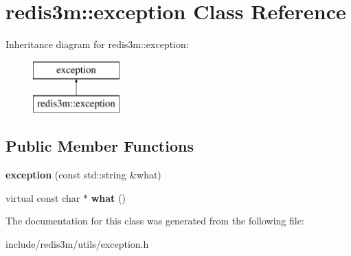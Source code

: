 \hypertarget{classredis3m_1_1exception}{\section{redis3m\-:\-:exception Class Reference}
\label{classredis3m_1_1exception}
}
Inheritance diagram for redis3m\-:\-:exception\-:\begin{figure}[H]
\begin{center}
\leavevmode
\includegraphics[height=2.000000cm]{classredis3m_1_1exception}
\end{center}
\end{figure}
\subsection*{Public Member Functions}
\begin{DoxyCompactItemize}
\item 
\hypertarget{classredis3m_1_1exception_a35b7fdb79d34ea259cf5a8473f20509c}{{\bfseries exception} (const std\-::string \&what)}\label{classredis3m_1_1exception_a35b7fdb79d34ea259cf5a8473f20509c}

\item 
\hypertarget{classredis3m_1_1exception_a08d93701a8d0d6900d2cae0304597f3c}{virtual const char $\ast$ {\bfseries what} ()}\label{classredis3m_1_1exception_a08d93701a8d0d6900d2cae0304597f3c}

\end{DoxyCompactItemize}


The documentation for this class was generated from the following file\-:\begin{DoxyCompactItemize}
\item 
include/redis3m/utils/exception.\-h\end{DoxyCompactItemize}
